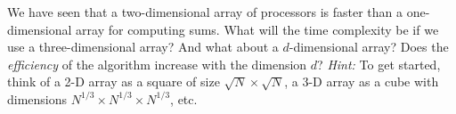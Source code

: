 We have seen that a two-dimensional array of processors is faster than
a one-dimensional array for computing sums.  What will the time
complexity be if we use a three-dimensional array?  And what about a
$d$-dimensional array?  Does the {\em efficiency} of the algorithm
increase with the dimension $d$?
{\em Hint:} To get started,
think of a 2-D array as a square of size $\sqrt{N} \times  \sqrt{N}$,
a 3-D array as a cube with dimensions $N^{1/3} \times  N^{1/3} \times  N^{1/3}$,
etc.

